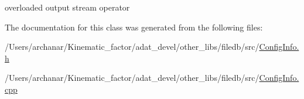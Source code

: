 overloaded output stream operator 

The documentation for this class was generated from the following files\+:\begin{DoxyCompactItemize}
\item 
/\+Users/archanar/\+Kinematic\+\_\+factor/adat\+\_\+devel/other\+\_\+libs/filedb/src/\mbox{\hyperlink{other__libs_2filedb_2src_2ConfigInfo_8h}{Config\+Info.\+h}}\item 
/\+Users/archanar/\+Kinematic\+\_\+factor/adat\+\_\+devel/other\+\_\+libs/filedb/src/\mbox{\hyperlink{ConfigInfo_8cpp}{Config\+Info.\+cpp}}\end{DoxyCompactItemize}
